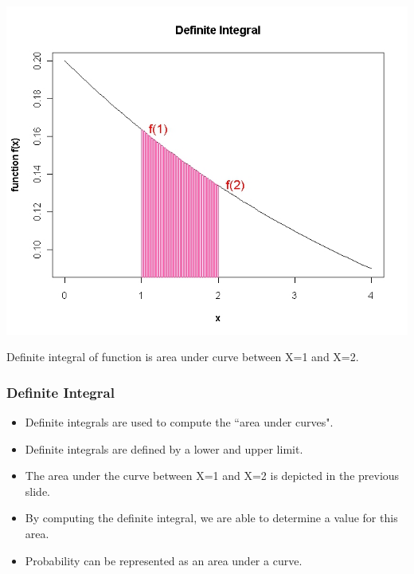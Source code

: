 \vspace{-0.5cm}
\begin{center}
\includegraphics[scale=0.35]{6ADefiniteIntegral}
\end{center}
Definite integral of function is area under curve between X=1 and X=2.
\smallskip 

\frametitle{Definite Integral}
\begin{itemize}
\item Definite integrals are used to compute the ``area under curves".
\item Definite integrals are defined by a lower and upper limit.
\item The area under the curve between X=1 and  X=2 is depicted in the previous slide.
\item By computing the definite integral, we are able to determine a value for this area.
\item Probability can be represented as an area under a curve.
\end{itemize}
\smallskip 

\smallskip 

